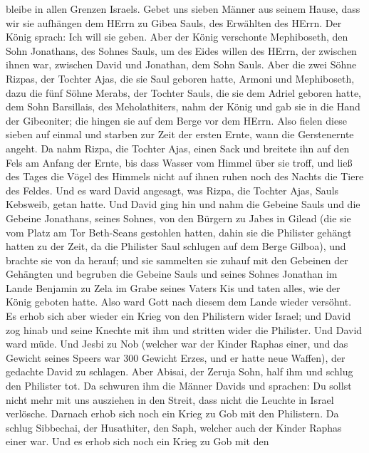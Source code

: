 bleibe in allen Grenzen Israels.  Gebet uns sieben Männer
aus seinem Hause, dass wir sie aufhängen dem HErrn zu Gibea Sauls, des
Erwählten des HErrn. Der König sprach: Ich will sie geben. 
Aber der König verschonte Mephiboseth, den Sohn Jonathans, des Sohnes
Sauls, um des Eides willen des HErrn, der zwischen ihnen war, zwischen
David und Jonathan, dem Sohn Sauls.  Aber die zwei Söhne
Rizpas, der Tochter Ajas, die sie Saul geboren hatte, Armoni und
Mephiboseth, dazu die fünf Söhne Merabs, der Tochter Sauls, die sie dem
Adriel geboren hatte, dem Sohn Barsillais, des Meholathiters, nahm der
König  und gab sie in die Hand der Gibeoniter; die hingen
sie auf dem Berge vor dem HErrn. Also fielen diese sieben auf einmal und
starben zur Zeit der ersten Ernte, wann die Gerstenernte angeht.
 Da nahm Rizpa, die Tochter Ajas, einen Sack und breitete
ihn auf den Fels am Anfang der Ernte, bis dass Wasser vom Himmel über
sie troff, und ließ des Tages die Vögel des Himmels nicht auf ihnen
ruhen noch des Nachts die Tiere des Feldes.  Und es ward
David angesagt, was Rizpa, die Tochter Ajas, Sauls Kebsweib, getan
hatte.  Und David ging hin und nahm die Gebeine Sauls und
die Gebeine Jonathans, seines Sohnes, von den Bürgern zu Jabes in Gilead
(die sie vom Platz am Tor Beth-Seans gestohlen hatten, dahin sie die
Philister gehängt hatten zu der Zeit, da die Philister Saul schlugen auf
dem Berge Gilboa),  und brachte sie von da herauf; und sie
sammelten sie zuhauf mit den Gebeinen der Gehängten  und
begruben die Gebeine Sauls und seines Sohnes Jonathan im Lande Benjamin
zu Zela im Grabe seines Vaters Kis und taten alles, wie der König
geboten hatte. Also ward Gott nach diesem dem Lande wieder versöhnt.
 Es erhob sich aber wieder ein Krieg von den Philistern
wider Israel; und David zog hinab und seine Knechte mit ihm und stritten
wider die Philister. Und David ward müde.  Und Jesbi zu Nob
(welcher war der Kinder Raphas einer, und das Gewicht seines Speers war
300 Gewicht Erzes, und er hatte neue Waffen), der gedachte David zu
schlagen.  Aber Abisai, der Zeruja Sohn, half ihm und
schlug den Philister tot. Da schwuren ihm die Männer Davids und
sprachen: Du sollst nicht mehr mit uns ausziehen in den Streit, dass
nicht die Leuchte in Israel verlösche.  Darnach erhob sich
noch ein Krieg zu Gob mit den Philistern. Da schlug Sibbechai, der
Husathiter, den Saph, welcher auch der Kinder Raphas einer war.
 Und es erhob sich noch ein Krieg zu Gob mit den
